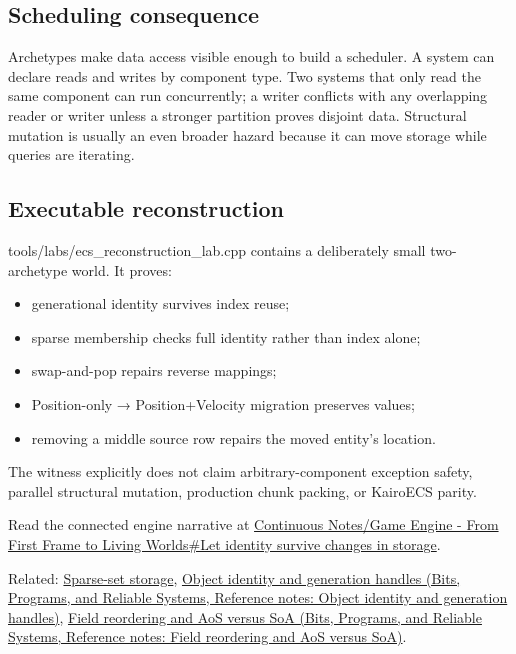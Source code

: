 \subsection{Scheduling consequence}\label{appendix-fbfeb0430008-scheduling-consequence}

Archetypes make data access visible enough to build a scheduler. A system can declare reads and writes by component type. Two systems that only read the same component can run concurrently; a writer conflicts with any overlapping reader or writer unless a stronger partition proves disjoint data. Structural mutation is usually an even broader hazard because it can move storage while queries are iterating.

\subsection{Executable reconstruction}\label{appendix-fbfeb0430008-executable-reconstruction}

tools/labs/ecs\_reconstruction\_lab.cpp contains a deliberately small two-archetype world. It proves:

\begin{itemize}
\tightlist
\item
  generational identity survives index reuse;
\item
  sparse membership checks full identity rather than index alone;
\item
  swap-and-pop repairs reverse mappings;
\item
  Position-only → Position+Velocity migration preserves values;
\item
  removing a middle source row repairs the moved entity's location.
\end{itemize}

The witness explicitly does not claim arbitrary-component exception safety, parallel structural mutation, production chunk packing, or KairoECS parity.

Read the connected engine narrative at \hyperref[05-engine-i-ch014-let-identity-survive-changes-in-storage]{Continuous Notes/Game Engine - From First Frame to Living Worlds\#Let identity survive changes in storage}.

Related: \hyperref[appendix-8404d0b1a3e7]{Sparse-set storage}, \href{../01-Bits-Programs-and-Reliable-Systems/main.pdf\#nameddest=appendix-f1581457d322}{Object identity and generation handles (Bits, Programs, and Reliable Systems, Reference notes: Object identity and generation handles)}, \href{../01-Bits-Programs-and-Reliable-Systems/main.pdf\#nameddest=appendix-5522ad176ca0}{Field reordering and AoS versus SoA (Bits, Programs, and Reliable Systems, Reference notes: Field reordering and AoS versus SoA)}.

